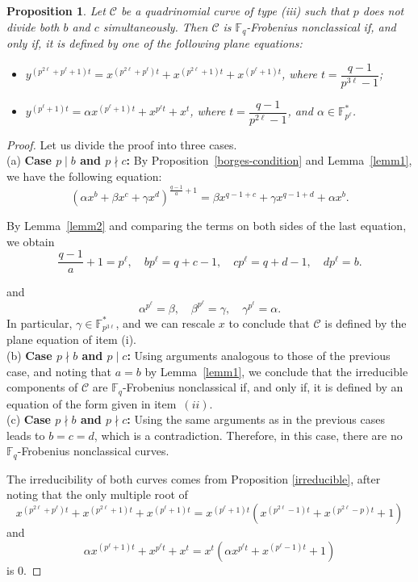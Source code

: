 \documentclass[preprint,12pt]{elsarticle}
\newtheorem{proposition}[theorem]{Proposition}
\begin{document}
\begin{proposition}
Let $\mathcal{C}$ be a quadrinomial curve of type (iii) such that $p$ does not divide both $b$ and $c$ simultaneously. Then $\mathcal{C}$ is $\mathbb{F}_q$-Frobenius nonclassical if, and only if, it is defined by one of the following plane equations:
\begin{itemize}
    \item[(i)] $y^{(p^{2 \ell} + p^\ell + 1)t} = x^{(p^{2 \ell} + p^\ell)t} + x^{(p^{2 \ell} + 1)t} + x^{(p^\ell + 1)t}$, where $t = \dfrac{q - 1}{p^{3\ell} - 1}$;
    
    \item[(ii)] $y^{(p^\ell+1)t} = \alpha x^{(p^\ell+1)t} + x^{p^{\ell}t} + x^{t}$, where $t = \dfrac{q - 1}{p^{2\ell} - 1}$, and $\alpha \in \mathbb{F}_{p^{\ell}}^*$.
\end{itemize}
\end{proposition}

\begin{proof}
Let us divide the proof into three cases. 
\\

\noindent (a) \textbf{Case $p \mid b$ and $p \nmid c$:} By Proposition~\ref{borges-condition} and Lemma~\ref{lemm1}, we have the following equation:
\begin{equation*}
(\alpha x^b + \beta x^c + \gamma x^d)^{\frac{q-1}{a} + 1}
= \beta x^{q-1+c} + \gamma x^{q-1+d} + \alpha x^b.
\end{equation*}

By Lemma~\ref{lemm2} and comparing the terms on both sides of the last equation, we obtain
\[
\frac{q - 1}{a} + 1 = p^\ell, \quad
b p^\ell = q + c - 1, \quad
c p^\ell = q + d - 1, \quad
d p^\ell = b.
\]

and
$$
\alpha^{p^\ell} = \beta, \quad \beta^{p^\ell} = \gamma, \quad \gamma^{p^\ell} = \alpha.
$$
In particular, $\gamma \in \mathbb{F}_{p^{3\ell}}^*$, and we can rescale $x$ to conclude that $\mathcal{C}$ is defined by the plane equation of item (i).
\\

\noindent (b) \textbf{Case $p \nmid b$ and $p \mid c$:}
Using arguments analogous to those of the previous case, and noting that $a = b$ by Lemma~\ref{lemm1}, we conclude that the irreducible components of $\mathcal{C}$ are $\mathbb{F}_q$-Frobenius nonclassical if, and only if, it is defined by an equation of the form given in item~$(ii)$.
\\

\noindent (c) \textbf{Case $p \nmid b$ and $p \nmid c$:}
Using the same arguments as in the previous cases leads to $b = c = d$, which is a contradiction. Therefore, in this case, there are no $\mathbb{F}_q$-Frobenius nonclassical curves.

The irreducibility of both curves comes from Proposition \ref{irreducible}, after noting that the only multiple root of 
$$x^{(p^{2 \ell} + p^\ell)t} + x^{(p^{2 \ell} + 1)t} + x^{(p^\ell + 1)t} = x^{(p^{\ell}+1)t}(x^{(p^{2\ell}-1)t} + x^{(p^{2\ell}-p)t} + 1)$$
and
$$\alpha x^{(p^\ell+1)t} + x^{p^{\ell}t} + x^{t} = x^t(\alpha x^{p^{\ell}t} + x^{(p^{\ell}-1)t} + 1)$$
is $0$.
\end{proof}
\end{document}
